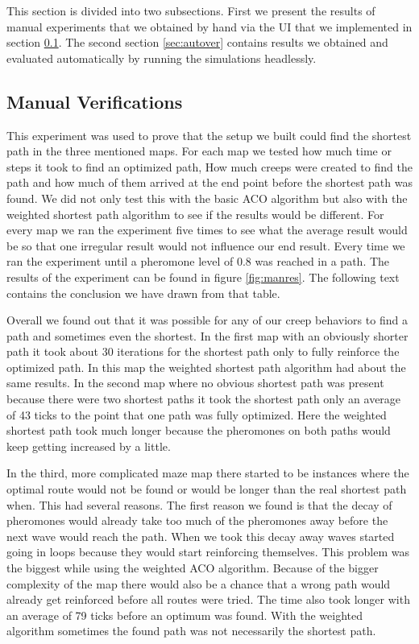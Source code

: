 This section is divided into two subsections. First we present the results of manual experiments that we obtained by hand via the UI that we implemented in section \ref{sec:manualver}.
The second section \ref{sec:autover} contains results we obtained and evaluated automatically by running the simulations headlessly.

\subsection{Manual Verifications}
\label{sec:manualver}
This experiment was used to prove that the setup we built could find the shortest path in the three mentioned maps. For each map we tested how much time or steps it took to find an optimized path, How much creeps were created to find the path and how much of them arrived at the end point before the shortest path was found. We did not only test this with the basic ACO algorithm but also with the weighted shortest path algorithm to see if the results would be different. For every map we ran the experiment five times to see what the average result would be so that one irregular result would not influence our end result. Every time we ran the experiment until a pheromone level of 0.8 was reached in a path.
The results of the experiment can be found in figure \ref{fig:manres}. The following text contains the conclusion we have drawn from that table.

Overall we found out that it was possible for any of our creep behaviors  to find a path and sometimes even the shortest. In the first map with an obviously shorter path it took about 30 iterations for the shortest path only to fully reinforce the optimized path. In this map the weighted shortest path algorithm had about the same results. In the second map where no obvious shortest path was present because there were two shortest paths it took the shortest path only an average of 43 ticks to the point that one path was fully optimized. Here the weighted shortest path took much longer because the pheromones on both paths would keep getting increased by a little.  

In the third, more complicated maze map there started to be instances where the optimal route would not be found or would be longer than the real shortest path when. This had several reasons. The first reason we found is that the decay of pheromones would already take too much of the pheromones away before the next wave would reach the path. When we took this decay away waves started going in loops because they would start reinforcing themselves. This problem was the biggest while using the weighted ACO algorithm. Because of the bigger complexity of the map there would also be a chance that a wrong path would already get reinforced before all routes were tried. The time also took longer with an average of 79 ticks before an optimum was found. With the weighted algorithm sometimes the found path was not necessarily the shortest path.

